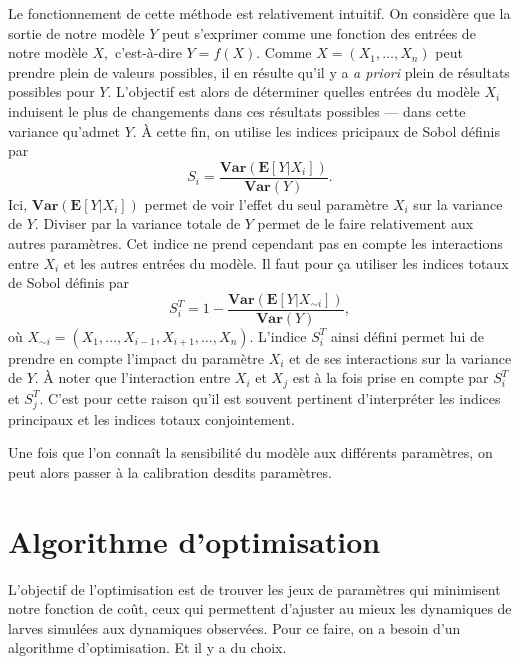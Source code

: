 Le fonctionnement de cette méthode est relativement intuitif.
On considère que la sortie de notre modèle $Y$ peut s'exprimer comme une fonction des entrées de notre modèle $X,$ c'est-à-dire $Y = f(X)$.
Comme $X = \left( X_1, \ldots, X_n \right)$ peut prendre plein de valeurs possibles, il en résulte qu'il y a \emph{a priori} plein de résultats possibles pour $Y.$
L'objectif est alors de déterminer quelles entrées du modèle $X_i$ induisent le plus de changements dans ces résultats possibles --- dans cette variance qu'admet $Y.$
À cette fin, on utilise les indices pricipaux de Sobol définis par
\[
S_i = \frac{\textbf{Var}\!\left( \mathbf{E}\!\left[Y|X_i\right] \right)}{\textbf{Var}\!\left( Y \right)}.
\]
Ici, $\textbf{Var}\!\left( \mathbf{E}\left[Y|X_i\right] \right)$ permet de voir l'effet du seul paramètre $X_i$ sur la variance de $Y.$
Diviser par la variance totale de $Y$ permet de le faire relativement aux autres paramètres.
Cet indice ne prend cependant pas en compte les interactions entre $X_i$ et les autres entrées du modèle. 
Il faut pour ça utiliser les indices totaux de Sobol définis par
\[
S^T_i = 1 - \frac{\textbf{Var}\!\left( \mathbf{E}\!\left[Y|X_{\sim i}\right] \right)}{\textbf{Var}\!\left( Y \right)},
\]
où $X_{\sim i} = \left(X_1, \ldots, X_{i-1}, X_{i+1}, \ldots, X_n \right)$.
L'indice $S^T_i$ ainsi défini permet lui de prendre en compte l'impact du paramètre $X_i$ et de ses interactions sur la variance de $Y$.
À noter que l'interaction entre $X_i$ et $X_j$ est à la fois prise en compte par $S^T_i$ et $S^T_j$.
C'est pour cette raison qu'il est souvent pertinent d'interpréter les indices principaux et les indices totaux conjointement.

Une fois que l'on connaît la sensibilité du modèle aux différents paramètres, on peut alors passer à la calibration desdits paramètres.


\section{Algorithme d'optimisation}

L'objectif de l'optimisation est de trouver les jeux de paramètres qui minimisent notre fonction de coût, ceux qui permettent d'ajuster au mieux les dynamiques de larves simulées aux dynamiques observées.
Pour ce faire, on a besoin d'un algorithme d'optimisation.
Et il y a du choix.

